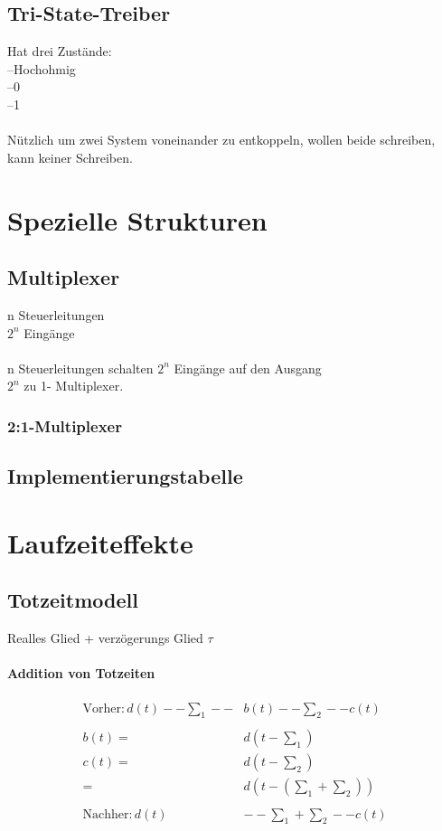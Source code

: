 \documentclass[a4paper]{scrartcl}
\begin{document}
		\subsection{Tri-State-Treiber}
		Hat drei Zustände:\\
		--Hochohmig\\
		--0\\
		--1\\
		\\
		Nützlich um zwei System voneinander zu entkoppeln, wollen beide schreiben, kann keiner Schreiben.\\
		
		\section{Spezielle Strukturen}
			 \subsection{Multiplexer}
			 n Steuerleitungen\\
			 \( 2^n \) Eingänge\\
			 \\
			 n Steuerleitungen schalten \(2^n \) Eingänge auf den Ausgang\\
			 \( 2^n \) zu 1- Multiplexer.\\
				 \subsubsection{2:1-Multiplexer}
			\subsection{Implementierungstabelle}
		
	\section{Laufzeiteffekte}
	
		\subsection{Totzeitmodell}
		Realles Glied + verzögerungs Glied \( \tau \)\\
		
		\paragraph{Addition von Totzeiten}
		\begin{align*}
			\text{Vorher}:
			d(t) -- \sum_1 -- &b(t) -- \sum_2 -- c(t)\\
			\\
			b(t) =& d(t - \sum_1)\\
			c(t) =& d(t - \sum_2)\\
			=& d(t - (\sum_1 + \sum_2))\\
			\\
			\text{Nachher}:
			d(t) &-- \sum_1 + \sum_2 -- c(t)
		\end{align*}
		
\end{document}
